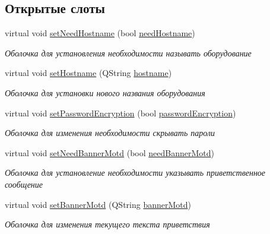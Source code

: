 \subsection*{Открытые слоты}
\begin{DoxyCompactItemize}
\item 
virtual void \hyperlink{class_network_equipment_model_a952a89f03887ab83ed42d404aad7acf4}{set\+Need\+Hostname} (bool \hyperlink{class_network_equipment_model_a67cb5cf3284a19a1a0d6a7b22fa2a91e}{need\+Hostname})
\begin{DoxyCompactList}\small\item\em Оболочка для установления необходимости называть оборудование \end{DoxyCompactList}\item 
virtual void \hyperlink{class_network_equipment_model_a844d05c49e462ea50dbf07b73597f65c}{set\+Hostname} (Q\+String \hyperlink{class_network_equipment_model_a59f5581ce5f16229235bc9ace24e11d6}{hostname})
\begin{DoxyCompactList}\small\item\em Оболочка для установки нового названия оборудования \end{DoxyCompactList}\item 
virtual void \hyperlink{class_network_equipment_model_a0303cb675bc0d42bff6b90d6e7b8bbb1}{set\+Password\+Encryption} (bool \hyperlink{class_network_equipment_model_a46900023e99e2791d5e0ff85204f25fb}{password\+Encryption})
\begin{DoxyCompactList}\small\item\em Оболочка для изменения необходимости скрывать пароли \end{DoxyCompactList}\item 
virtual void \hyperlink{class_network_equipment_model_a45955890b14b8dbd4f76df92cff2a82e}{set\+Need\+Banner\+Motd} (bool \hyperlink{class_network_equipment_model_ab20b1087ae50a8546bdabfa598e8c647}{need\+Banner\+Motd})
\begin{DoxyCompactList}\small\item\em Оболочка для установление необходимости указывать приветственное сообщение \end{DoxyCompactList}\item 
virtual void \hyperlink{class_network_equipment_model_a73bfb9a80a611f8925e23b4e68c95821}{set\+Banner\+Motd} (Q\+String \hyperlink{class_network_equipment_model_a9256503fdb609788939777565574ae7c}{banner\+Motd})
\begin{DoxyCompactList}\small\item\em Оболочка для изменения текущего текста приветствия \end{DoxyCompactList}\item 

\end{DoxyCompactItemize}
